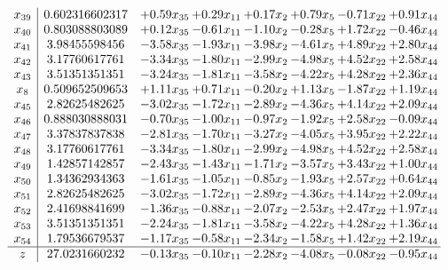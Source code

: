 \documentclass[8pt]{article}
\begin{document}
\[\begin{array}{c| c c@{\hskip 2pt} c@{\hskip 2pt} c@{\hskip 2pt} c@{\hskip 2pt} c@{\hskip 2pt} c@{\hskip 2pt} }
 x_{39}   &  0.602316602317 & +  0.59 x_{35} & +  0.29 x_{11} & +  0.17 x_{2} & +  0.79 x_{5} & -0.71 x_{22} & +  0.91 x_{44}\\
 x_{40}   &  0.803088803089 & +  0.12 x_{35} & -0.61 x_{11} & -1.10 x_{2} & -0.28 x_{5} & +  1.72 x_{22} & -0.46 x_{44}\\
 x_{41}   &  3.98455598456 & -3.58 x_{35} & -1.93 x_{11} & -3.98 x_{2} & -4.61 x_{5} & +  4.89 x_{22} & +  2.80 x_{44}\\
 x_{42}   &  3.17760617761 & -3.34 x_{35} & -1.80 x_{11} & -2.99 x_{2} & -4.98 x_{5} & +  4.52 x_{22} & +  2.58 x_{44}\\
 x_{43}   &  3.51351351351 & -3.24 x_{35} & -1.81 x_{11} & -3.58 x_{2} & -4.22 x_{5} & +  4.28 x_{22} & +  2.36 x_{44}\\
 x_{8}   &  0.509652509653 & +  1.11 x_{35} & +  0.71 x_{11} & -0.20 x_{2} & +  1.13 x_{5} & -1.87 x_{22} & +  1.19 x_{44}\\
 x_{45}   &  2.82625482625 & -3.02 x_{35} & -1.72 x_{11} & -2.89 x_{2} & -4.36 x_{5} & +  4.14 x_{22} & +  2.09 x_{44}\\
 x_{46}   &  0.888030888031 & -0.70 x_{35} & -1.00 x_{11} & -0.97 x_{2} & -1.92 x_{5} & +  2.58 x_{22} & -0.09 x_{44}\\
 x_{47}   &  3.37837837838 & -2.81 x_{35} & -1.70 x_{11} & -3.27 x_{2} & -4.05 x_{5} & +  3.95 x_{22} & +  2.22 x_{44}\\
 x_{48}   &  3.17760617761 & -3.34 x_{35} & -1.80 x_{11} & -2.99 x_{2} & -4.98 x_{5} & +  4.52 x_{22} & +  2.58 x_{44}\\
 x_{49}   &  1.42857142857 & -2.43 x_{35} & -1.43 x_{11} & -1.71 x_{2} & -3.57 x_{5} & +  3.43 x_{22} & +  1.00 x_{44}\\
 x_{50}   &  1.34362934363 & -1.61 x_{35} & -1.05 x_{11} & -0.85 x_{2} & -1.93 x_{5} & +  2.57 x_{22} & +  0.64 x_{44}\\
 x_{51}   &  2.82625482625 & -3.02 x_{35} & -1.72 x_{11} & -2.89 x_{2} & -4.36 x_{5} & +  4.14 x_{22} & +  2.09 x_{44}\\
 x_{52}   &  2.41698841699 & -1.36 x_{35} & -0.88 x_{11} & -2.07 x_{2} & -2.53 x_{5} & +  2.47 x_{22} & +  1.97 x_{44}\\
 x_{53}   &  3.51351351351 & -2.24 x_{35} & -1.81 x_{11} & -3.58 x_{2} & -4.22 x_{5} & +  4.28 x_{22} & +  1.36 x_{44}\\
 x_{54}   &  1.79536679537 & -1.17 x_{35} & -0.58 x_{11} & -2.34 x_{2} & -1.58 x_{5} & +  1.42 x_{22} & +  2.19 x_{44}\\
\hline
z    &  27.0231660232 & -0.13 x_{35} & -0.10 x_{11} & -2.28 x_{2} & -4.08 x_{5} & -0.08 x_{22} & -0.95 x_{44}\\
\end{array}\]
\end{document}
